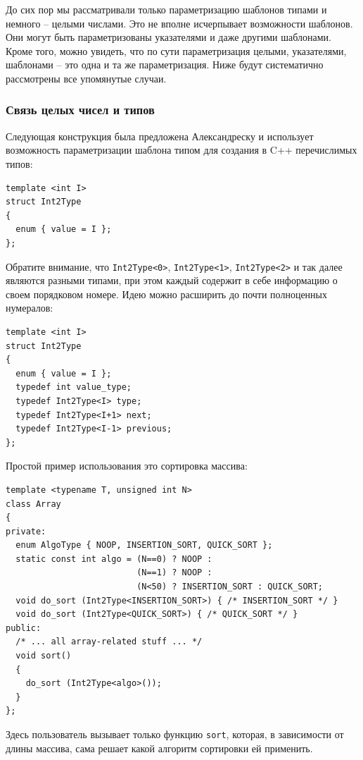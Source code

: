 \documentclass[a4paper,12pt,oneside]{article}
\begin{document}
До сих пор мы рассматривали только параметризацию шаблонов типами и немного -- целыми числами. Это не вполне исчерпывает возможности шаблонов. Они могут быть параметризованы указателями и даже другими шаблонами. Кроме того, можно увидеть, что по сути параметризация целыми, указателями, шаблонами -- это одна и та же параметризация. Ниже будут систематично рассмотрены все упомянутые случаи.

\subsubsection{Связь целых чисел и типов}

Следующая конструкция была предложена Александреску и использует возможность параметризации шаблона типом для создания в C++ перечислимых типов:

\begin{lstlisting}
template <int I>
struct Int2Type
{
  enum { value = I };
};
\end{lstlisting}

Обратите внимание, что \lstinline!Int2Type<0>!, \lstinline!Int2Type<1>!, \lstinline!Int2Type<2>! и так далее являются разными типами, при этом каждый содержит в себе информацию о своем порядковом номере. Идею можно расширить до почти полноценных нумералов:

\begin{lstlisting}
template <int I>
struct Int2Type
{
  enum { value = I };
  typedef int value_type;
  typedef Int2Type<I> type;
  typedef Int2Type<I+1> next;
  typedef Int2Type<I-1> previous;
};
\end{lstlisting}

Простой пример использования это сортировка массива:

\begin{lstlisting}
template <typename T, unsigned int N>
class Array 
{
private:
  enum AlgoType { NOOP, INSERTION_SORT, QUICK_SORT };
  static const int algo = (N==0) ? NOOP : 
                          (N==1) ? NOOP :
                          (N<50) ? INSERTION_SORT : QUICK_SORT;
  void do_sort (Int2Type<INSERTION_SORT>) { /* INSERTION_SORT */ }
  void do_sort (Int2Type<QUICK_SORT>) { /* QUICK_SORT */ }
public:
  /* ... all array-related stuff ... */
  void sort()
  {
    do_sort (Int2Type<algo>());
  }
};
\end{lstlisting}

Здесь пользователь вызывает только функцию \lstinline!sort!, которая, в зависимости от длины массива, сама решает какой алгоритм сортировки ей применить.
\end{document}
